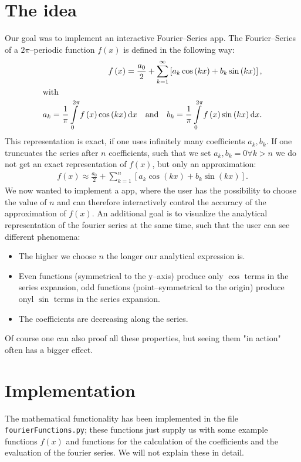 \documentclass[a4paper,pdftex]{scrartcl}
\newcommand{\dx}{\text{d}x}
\begin{document}
\section{The idea}
Our goal was to implement an interactive Fourier--Series app. The Fourier--Series of a $2\pi$--periodic  function $f(x)$ is defined in the following way:
\begin{align*}
f\left(x \right) = \frac{a_0}{2}+\sum\limits_{k=1}^\infty \left[a_k \cos\left(kx \right) + b_k \sin\left(kx\right)\right],\\
\intertext{with}
a_k = \frac{1}{\pi}\int\limits_{0}^{2\pi} f\left(x \right)\cos\left(kx\right)\dx \text{\quad and\quad }
b_k = \frac{1}{\pi}\int\limits_{0}^{2\pi} f\left(x \right)\sin\left(kx\right)\dx.
\end{align*}
This representation is exact, if one uses infinitely many coefficients $a_k,b_k$. If one truncuates the series after $n$ coefficients, such that we set $a_k,b_k = 0 \forall k>n$ we do not get an exact representation of $f(x)$, but only an approximation:
\begin{align*}
f\left(x \right) \approx \frac{a_0}{2}+\sum\limits_{k=1}^n \left[a_k \cos\left(kx \right) + b_k \sin\left(kx\right)\right].
\end{align*}
We now wanted to implement a app, where the user has the possibility to choose the value of $n$ and can therefore interactively control the accuracy of the approximation of $f(x)$. An additional goal is to visualize the analytical representation of the fourier series at the same time, such that the user can see different phenomena:
\begin{itemize}
\item The higher we choose $n$ the longer our analytical expression is.
\item Even functions (symmetrical to the y--axis) produce only $\cos$ terms in the series expansion, odd functions (point--symmetrical to the origin) produce onyl $\sin$ terms in the series expansion.
\item The coefficients are decreasing along the series.
\end{itemize}
Of course one can also proof all these properties, but seeing them "in action" often has a bigger effect.

\section{Implementation}
The mathematical functionality has been implemented in the file \verb!fourierFunctions.py!; these functions just supply us with some example functions $f(x)$ and functions for the calculation of the coefficients and the evaluation of the fourier series. We will not explain these in detail.
\end{document}
